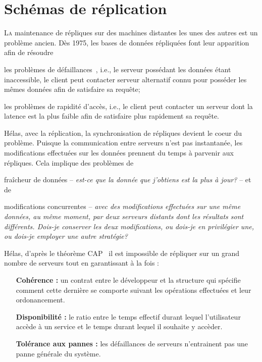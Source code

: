
\chapter{Schémas de réplication}
\label{repl:chap:replication}

\minitoc

\lettrine{L}a maintenance de répliques sur des machines distantes les unes des
autres est un problème ancien. Dès 1975, les bases de données répliquées font
leur apparition~\cite{johnson1975maintenance} afin de résoudre
\begin{inparaenum}[(i)]
\item les problèmes de défaillances~\cite{alsberg1976principle}, i.e., le
  serveur possédant les données étant inaccessible, le client peut contacter
  serveur alternatif connu pour posséder les mêmes données afin de satisfaire sa
  requête;
\item les problèmes de rapidité d'accès, i.e., le client peut contacter un
  serveur dont la latence est la plus faible afin de satisfaire plus rapidement
  sa requête.
\end{inparaenum}

Hélas, avec la réplication, la synchronisation de répliques devient le coeur du
problème. Puisque la communication entre serveurs n'est pas instantanée, les
modifications effectuées sur les données prennent du temps à parvenir aux
répliques. Cela implique des problèmes de
\begin{inparaenum}[(i)]
\item fraîcheur de données -- \emph{est-ce que la donnée que j'obtiens est la
    plus à jour?} -- et de
\item modifications concurrentes -- \emph{avec des modifications effectuées sur
    une même données, au même moment, par deux serveurs distants dont les
    résultats sont différents. Dois-je conserver les deux modifications, ou
    dois-je en privilégier une, ou dois-je employer une autre stratégie?}
\end{inparaenum}


Hélas, d'après le théorème CAP~\cite{gilbert2002brewer} il est impossible de
répliquer sur un grand nombre de serveurs tout en garantissant à la fois :
\begin{itemize}
\item [\textbf{Cohérence :}] un contrat entre le développeur et la structure qui
  spécifie comment cette dernière se comporte suivant les opérations effectuées
  et leur ordonancement.
\item [\textbf{Disponibilité :}] le ratio entre le temps effectif durant lequel
  l'utilisateur accède à un service et le temps durant lequel il souhaite y
  accèder.
\item [\textbf{Tolérance aux pannes :}] les défaillances de serveurs
  n'entrainent pas une panne générale du système.
\end{itemize}

